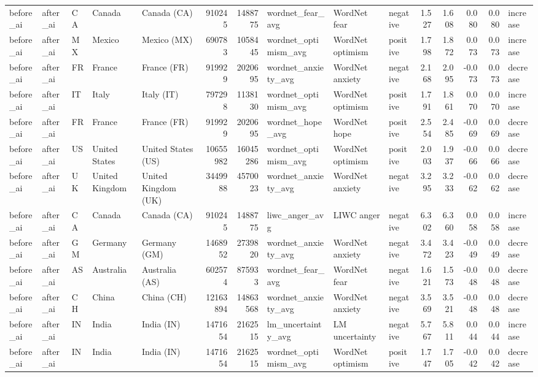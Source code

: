 \begin{tabular}{lllllrrlllrrrrl}
before\_ai & after\_ai & CA & Canada & Canada (CA) & 910245 & 1488775 & wordnet\_fear\_avg & WordNet fear & negative & 1.527 & 1.608 & 0.080 & 0.080 & increase \\
before\_ai & after\_ai & MX & Mexico & Mexico (MX) & 690783 & 1058445 & wordnet\_optimism\_avg & WordNet optimism & positive & 1.798 & 1.872 & 0.073 & 0.073 & increase \\
before\_ai & after\_ai & FR & France & France (FR) & 919929 & 2020695 & wordnet\_anxiety\_avg & WordNet anxiety & negative & 2.168 & 2.095 & -0.073 & 0.073 & decrease \\
before\_ai & after\_ai & IT & Italy & Italy (IT) & 797298 & 1138130 & wordnet\_optimism\_avg & WordNet optimism & positive & 1.791 & 1.861 & 0.070 & 0.070 & increase \\
before\_ai & after\_ai & FR & France & France (FR) & 919929 & 2020695 & wordnet\_hope\_avg & WordNet hope & positive & 2.554 & 2.485 & -0.069 & 0.069 & decrease \\
before\_ai & after\_ai & US & United States & United States (US) & 10655982 & 16045286 & wordnet\_optimism\_avg & WordNet optimism & positive & 2.003 & 1.937 & -0.066 & 0.066 & decrease \\
before\_ai & after\_ai & UK & United Kingdom & United Kingdom (UK) & 3449988 & 4570023 & wordnet\_anxiety\_avg & WordNet anxiety & negative & 3.295 & 3.233 & -0.062 & 0.062 & decrease \\
before\_ai & after\_ai & CA & Canada & Canada (CA) & 910245 & 1488775 & liwc\_anger\_avg & LIWC anger & negative & 6.302 & 6.360 & 0.058 & 0.058 & increase \\
before\_ai & after\_ai & GM & Germany & Germany (GM) & 1468952 & 2739820 & wordnet\_anxiety\_avg & WordNet anxiety & negative & 3.472 & 3.423 & -0.049 & 0.049 & decrease \\
before\_ai & after\_ai & AS & Australia & Australia (AS) & 602574 & 875933 & wordnet\_fear\_avg & WordNet fear & negative & 1.621 & 1.573 & -0.048 & 0.048 & decrease \\
before\_ai & after\_ai & CH & China & China (CH) & 12163894 & 14863568 & wordnet\_anxiety\_avg & WordNet anxiety & negative & 3.569 & 3.521 & -0.048 & 0.048 & decrease \\
before\_ai & after\_ai & IN & India & India (IN) & 1471654 & 2162515 & lm\_uncertainty\_avg & LM uncertainty & negative & 5.767 & 5.811 & 0.044 & 0.044 & increase \\
before\_ai & after\_ai & IN & India & India (IN) & 1471654 & 2162515 & wordnet\_optimism\_avg & WordNet optimism & positive & 1.747 & 1.705 & -0.042 & 0.042 & decrease \\

\end{tabular}
